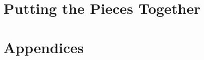 \documentclass[12pt,chapterprefix=true]{scrbook}
\begin{document}
%

\part{Putting the Pieces Together}











%

%




\part{Appendices}

\cleardoubleoddpage
\appendix
\let\chaptername\appendixname
\renewcommand{\chaptermark}[1]{\markboth{Appendix\ \thechapter.\ #1}{}}





\cleardoubleoddpage
\printglossaries
\end{document}
